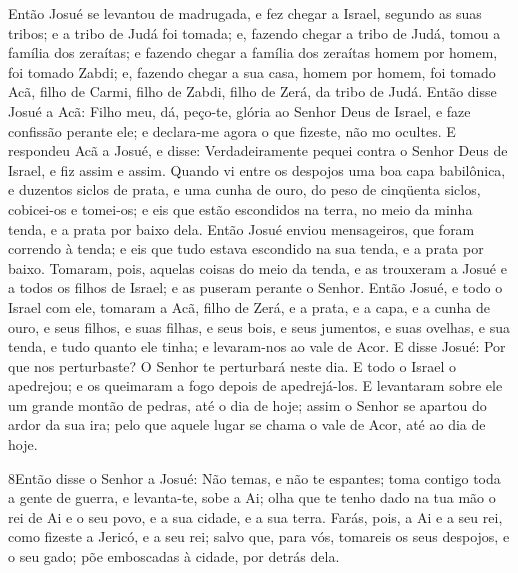 Então Josué se levantou de madrugada, e fez chegar a Israel,
segundo as suas tribos; e a tribo de Judá foi tomada; e,
fazendo chegar a tribo de Judá, tomou a família dos zeraítas; e
fazendo chegar a família dos zeraítas homem por homem, foi tomado
Zabdi; e, fazendo chegar a sua casa, homem por homem, foi
tomado Acã, filho de Carmi, filho de Zabdi, filho de Zerá, da tribo
de Judá. Então disse Josué a Acã: Filho meu, dá, peço-te,
glória ao Senhor Deus de Israel, e faze confissão perante ele; e
declara-me agora o que fizeste, não mo ocultes. E respondeu
Acã a Josué, e disse: Verdadeiramente pequei contra o Senhor Deus de
Israel, e fiz assim e assim. Quando vi entre os despojos uma
boa capa babilônica, e duzentos siclos de prata, e uma cunha de
ouro, do peso de cinqüenta siclos, cobicei-os e tomei-os; e eis que
estão escondidos na terra, no meio da minha tenda, e a prata por
baixo dela. Então Josué enviou mensageiros, que foram
correndo à tenda; e eis que tudo estava escondido na sua tenda, e a
prata por baixo. Tomaram, pois, aquelas coisas do meio da
tenda, e as trouxeram a Josué e a todos os filhos de Israel; e as
puseram perante o Senhor. Então Josué, e todo o Israel com
ele, tomaram a Acã, filho de Zerá, e a prata, e a capa, e a cunha de
ouro, e seus filhos, e suas filhas, e seus bois, e seus jumentos, e
suas ovelhas, e sua tenda, e tudo quanto ele tinha; e levaram-nos ao
vale de Acor. E disse Josué: Por que nos perturbaste? O
Senhor te perturbará neste dia. E todo o Israel o apedrejou; e os
queimaram a fogo depois de apedrejá-los. E levantaram sobre
ele um grande montão de pedras, até o dia de hoje; assim o Senhor se
apartou do ardor da sua ira; pelo que aquele lugar se chama o vale
de Acor, até ao dia de hoje.

\medskip

\lettrine{8} Então disse o Senhor a Josué: Não temas, e não te
espantes; toma contigo toda a gente de guerra, e levanta-te, sobe a
Ai; olha que te tenho dado na tua mão o rei de Ai e o seu povo, e a
sua cidade, e a sua terra. Farás, pois, a Ai e a seu rei, como
fizeste a Jericó, e a seu rei; salvo que, para vós, tomareis os seus
despojos, e o seu gado; põe emboscadas à cidade, por detrás dela.

